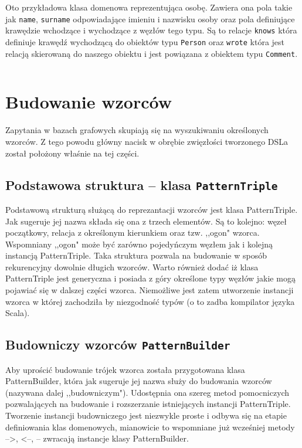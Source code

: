 \documentclass[brudnopis]{xmgr}
\begin{document}
Oto przykładowa klasa domenowa reprezentująca osobę. Zawiera ona pola takie jak \texttt{name}, \texttt{surname} odpowiadające imieniu i nazwisku osoby oraz pola definiujące krawędzie wchodzące i wychodzące z węzłów tego typu. Są to relacje \texttt{knows} która definiuje krawędź wychodzącą do obiektów typu \texttt{Person} oraz \texttt{wrote} która jest relacją skierowaną do naszego obiektu i jest powiązana z obiektem typu \texttt{Comment}.

\inputminted{scala}{listings/scala/dsl/sample-model.scala}

\section{Budowanie wzorców}

Zapytania w bazach grafowych skupiają się na wyszukiwaniu określonych wzorców. Z tego powodu główny nacisk w obrębie zwięzłości tworzonego DSLa został położony właśnie na tej części.

\subsection{Podstawowa struktura -- klasa \texttt{PatternTriple}}
Podstawową strukturą służącą do reprezantacji wzorców jest klasa PatternTriple. Jak sugeruje jej nazwa składa się ona z trzech elementów. Są to kolejno: węzeł początkowy, relacja z określonym kierunkiem oraz tzw. ,,ogon" wzorca. Wspomniany ,,ogon" może być zarówno pojedyńczym węzłem jak i kolejną instancją PatternTriple. Taka struktura pozwala na budowanie w sposób rekurencyjny dowolnie długich wzorców. Warto również dodać iż klasa PatternTriple jest generyczna i posiada z góry określone typy węzłów jakie mogą pojawiać się w dalszej części wzorca.  Niemożliwe jest zatem utworzenie instancji wzorca w której zachodziła by niezgodność typów (o to zadba kompilator języka Scala).

\subsection{Budowniczy wzorców \texttt{PatternBuilder}}
Aby uprościć budowanie trójek wzorca została przygotowana klasa PatternBuilder, która jak sugeruje jej nazwa służy do budowania wzorców (nazywana dalej ,,budowniczym"). Udostępnia ona szereg metod pomocniczych pozwalających na budowanie i rozszerzanie istniejących instancji PatternTriple. Tworzenie instancji budowniczego jest niezwykle proste i odbywa się na etapie definiowania klas domenowych, mianowicie to wspomniane już wcześniej metody -->, <--, -- zwracają instancje klasy PatternBuilder.
\end{document}
